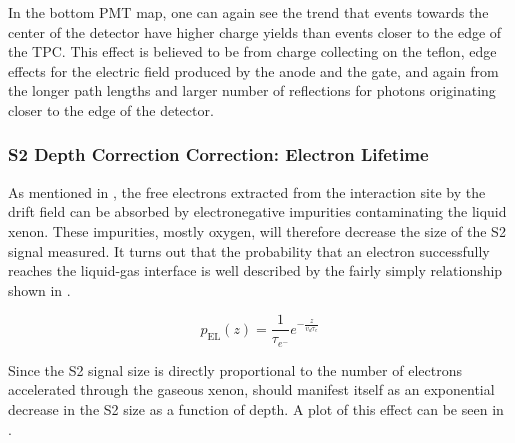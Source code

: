 In the bottom PMT map, one can again see the trend that events towards the center of the detector have higher charge yields than events closer to the edge of the TPC.  This effect is believed to be from charge collecting on the teflon, edge effects for the electric field produced by the anode and the gate, and again from the longer path lengths and larger number of reflections for photons originating closer to the edge of the detector.


\subsubsection{S2 Depth Correction Correction: Electron Lifetime}

As mentioned in , the free electrons extracted from the interaction site by the drift field can be absorbed by electronegative impurities contaminating the liquid xenon.  These impurities, mostly oxygen, will therefore decrease the size of the S2 signal measured.  It turns out that the probability that an electron successfully reaches the liquid-gas interface is well described by the fairly simply relationship shown in .

\begin{equation}
        \label{eqn:xe1t_electron_lifetime}
        p_{\textrm{EL}}(z) = \frac{1}{\tau_{e^-}} e^{-\frac{z}{v_d \tau_{e}}}
\end{equation} 

Since the S2 signal size is directly proportional to the number of electrons accelerated through the gaseous xenon,  should manifest itself as an exponential decrease in the S2 size as a function of depth.  A plot of this effect can be seen in .


